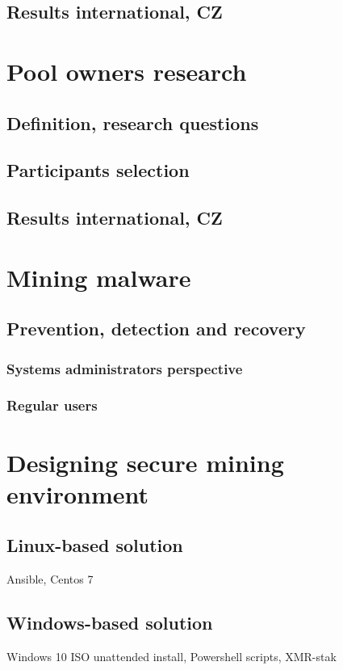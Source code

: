 \documentclass[
  printed, %
  table,   %
  nolof,     %
  nolot,     %
           oneside, color
]{fithesis3}
\begin{document}
\section{Results international, CZ}



\chapter{Pool owners research}
\section{Definition, research questions}
\section{Participants selection}
\section{Results international, CZ}

 
\chapter{Mining malware}
\section{Prevention, detection and recovery}
\subsection{Systems administrators perspective}
\subsection{Regular users}


\chapter{Designing secure mining environment}
\section{Linux-based solution}
Ansible, Centos 7
\section{Windows-based solution}
Windows 10 ISO unattended install, Powershell scripts, XMR-stak
\end{document}
